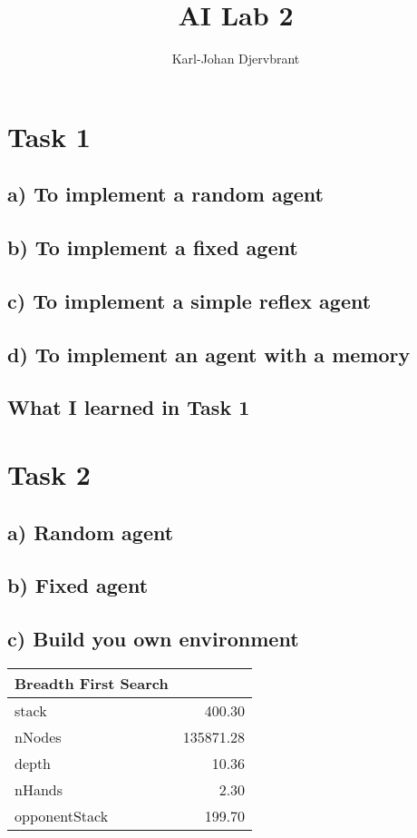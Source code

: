 \documentclass{article}
\title{AI Lab 2}
\author{Karl-Johan Djervbrant}
\begin{document}
\maketitle

\section{Task 1}
\subsection{a) To implement a random agent}

\subsection{b) To implement a fixed agent}

\subsection{c) To implement a simple reflex agent}

\subsection{d) To implement an agent with a memory}

\subsection{What I learned in Task 1}

\newpage
\section{Task 2}

\subsection{a) Random agent}

\subsection{b) Fixed agent}

\subsection{c) Build you own environment}

    \begin{tabular}{lr}
        \toprule
        {Breadth First Search} &   \\
        \midrule
        stack         &     400.30 \\
        nNodes        &  135871.28 \\
        depth         &      10.36 \\
        nHands        &       2.30 \\
        opponentStack &     199.70 \\
        \bottomrule
    \end{tabular}
\end{document}

